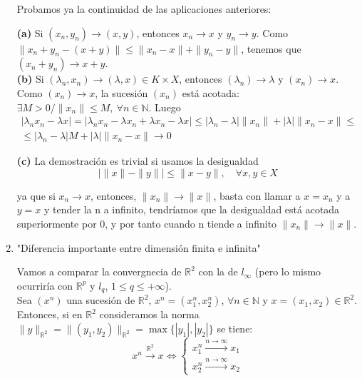 \documentclass{article}
\begin{document}
\begin{enumerate}
Probamos ya la continuidad de las aplicaciones anteriores:

\textbf{(a)} Si $(x_n,y_n)\rightarrow (x,y)$, entonces $x_n\rightarrow x$ y $y_n\rightarrow y$. Como $\|x_n+y_n-(x+y)\|\leq \|x_n-x\|+\|y_n-y\|$, tenemos que $(x_n+y_n)\rightarrow x+y$.\\

\textbf{(b)} Si $(\lambda_n,x_n)\rightarrow (\lambda,x)\in K\times X$, entonces $(\lambda_n)\rightarrow \lambda$ y $(x_n)\rightarrow x$. Como $(x_n)\rightarrow x$, la sucesión $(x_n)$ está acotada: $\exists M>0/\|x_n\|\leq M,\:\forall n\in \mathbb{N}$. Luego
\begin{gather*}
|\lambda_n x_n-\lambda x|=|\lambda_n x_n-\lambda x_n+\lambda x_n-\lambda x| \leq |\lambda_n-\lambda|\|x_n\|+|\lambda|\|x_n-x\|\leq \\
\leq |\lambda_n-\lambda|M+|\lambda|\|x_n-x\|\rightarrow 0
\end{gather*}

\textbf{(c)} La demostración es trivial si usamos la desigualdad
\begin{equation}
|\|x\|-\|y\||\leq \|x-y\|,\quad \forall x,y\in X
\end{equation}

ya que si $x_n\rightarrow x$, entonces, $\|x_n\|\rightarrow \|x\|$, basta con llamar a $x=x_n$ y a $y=x$ y tender la n a infinito, tendríamos que la desigualdad está acotada superiormente por 0, y por tanto cuando n tiende a infinito $\|x_n\|\rightarrow \|x\|$.


\item "Diferencia importante entre dimensión finita e infinita"

Vamos a comparar la convergnecia de $\mathbb{R}^2$ con la de $l_\infty$ (pero lo mismo ocurriría con $\mathbb{R}^p$ y $l_q$, $1\leq q\leq +\infty$).\\

Sea $(x^n)$ una sucesión de $\mathbb{R}^2$, $x^n=(x^n_1,x^n_2)$, $\forall n\in \mathbb{N}$ y $x=(x_1,x_2)\in \mathbb{R}^2$. Entonces, si en $\mathbb{R}^2$ consideramos la norma $\|y\|_{\mathbb{R}^2}=\|(y_1,y_2)\|_{\mathbb{R}^2}=\max\{|y_1|,|y_2|\}$ se tiene:
\begin{equation*}
x^n\xrightarrow{\mathbb{R}^2}x\Leftrightarrow \left\lbrace \begin{array}{c}
x_1^n\xrightarrow{n\to\infty} x_1\\
x_2^n\xrightarrow{n\to\infty} x_2
\end{array}\right.
\end{equation*}


\end{enumerate}
\end{document}
